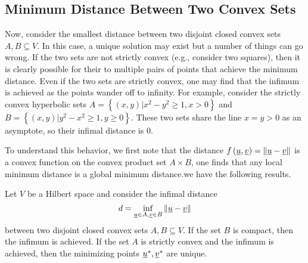 \subsection{Minimum Distance Between Two Convex Sets}

Now, consider the smallest distance between two disjoint closed convex sets $A,B\subseteq V$. In this case, a unique solution may exist but a number of things can go wrong. If the two sets are not strictly convex (e.g., consider two squares), then it is clearly possible for their to multiple pairs of points that achieve the minimum distance. Even if the two sets are strictly convex, one may find that the infimum is achieved as the points wander off to infinity. For example, consider the strictly convex hyperbolic sets $A=\left\{ (x,y)|x^{2}-y^{2}\geq1,x>0\right\} $ and $B=\left\{ (x,y)|y^{2}-x^{2}\geq1,y\geq0\right\} $. These two sets share the line $x=y>0$ as an asymptote, so their infimal distance is 0.

To understand this behavior, we first note that the distance $f\left(\underline u,\underline v\right)=\left\Vert \underline u-\underline v\right\Vert $ is a convex function on the convex product set $A\times B$, one finds that any local minimum distance is a global minimum distance.we have the following results.
\begin{theorem}
\label{thm:MinDistTwoConvexSet} Let $V$ be a Hilbert space and consider the infimal distance
\[
d=\inf_{\underline u\in A,\underline v\in B}\left\Vert \underline u-\underline v\right\Vert 
\]
between two disjoint closed convex sets $A,B\subseteq V$.
If the set $B$ is compact, then the infimum is achieved.
If the set $A$ is strictly convex and the infimum is achieved, then the minimizing points $\underline u^{*},\underline v^{*}$ are unique.
\end{theorem}

